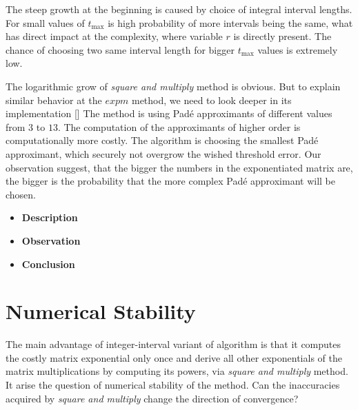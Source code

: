 \documentclass[thesis=M,english]{FITthesis}[2012/10/20]
\begin{document}
\begin{itemize}
The steep growth at the beginning is caused by choice of integral interval lengths. For small values of $t_{\max}$ is high probability of more intervals being the same, what has direct impact at the complexity, where variable $r$ is directly present. The chance of choosing two same interval length for bigger $t_{\max}$ values is extremely low.

The logarithmic grow of \textit{square and multiply} method is obvious. But to explain similar behavior at the $expm$ method, we need to look deeper in its implementation []%
The method is using Pad\'{e} approximants of different values from $3$ to $13$. The computation of the approximants of higher order is computationally more costly. The algorithm is choosing the smallest  Pad\'{e} approximant, which securely not overgrow the wished threshold error. Our observation suggest, that the bigger the numbers in the exponentiated matrix are, the bigger is the probability that the more complex Pad\'{e} approximant will be chosen.     

\end{itemize}

\begin{itemize}
\item \textbf{ Description }
\item \textbf{ Observation }
\item \textbf{ Conclusion }
\end{itemize}


\section{Numerical Stability}\label{sec:ns} 

The main advantage of integer-interval variant of algorithm is that it computes the costly matrix exponential only once and derive all other exponentials of the matrix multiplications by computing its powers, via \textit{square and multiply} method. It arise the question of numerical stability of the method. Can the inaccuracies acquired by \textit{square and multiply} change the direction of convergence?   
\end{document}
